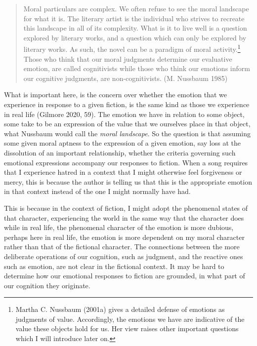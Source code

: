 \documentclass[12pt]{book}
\theoremstyle{definition}
\theoremstyle{remark}
\begin{document}
\begin{quote}
Moral particulars are complex. We often refuse to see the moral landscape for what it is. The literary artist is the individual who strives to recreate this landscape in all of its complexity. What is it to live well is a question explored by literary works, and a question which can only be explored by literary works. As such, the novel can be a paradigm of moral activity.\footnote{Martha C. Nussbaum (2001a) gives a detailed defense of emotions as judgments of value. Accordingly, the emotions we have are indicative of the value these objects hold for us. Her view raises other important questions which I will introduce later on.} Those who think that our moral judgments determine our evaluative emotion, are called cognitivists while those who think our emotions inform our cognitive judgments, are non-cognitivists. (M. Nussbaum 1985)
\end{quote}

What is important here, is the concern over whether the emotion that we experience in response to a given fiction, is the same kind as those we experience in real life (Gilmore 2020, 59). The emotion we have in relation to some object, some take to be an expression of the value that we ourselves place in that object, what Nussbaum would call the \emph{moral landscape}. So the question is that assuming some given moral aptness to the expression of a given emotion, say loss at the dissolution of an important relationship, whether the criteria governing such emotional expressions accompany our responses to fiction. When a song requires that I experience hatred in a context that I might otherwise feel forgiveness or mercy, this is because the author is telling us that this is the appropriate emotion in that context instead of the one I might normally have had.

This is because in the context of fiction, I might adopt the phenomenal states of that character, experiencing the world in the same way that the character does while in real life, the phenomenal character of the emotion is more dubious, perhaps here in real life, the emotion is more dependent on my moral character rather than that of the fictional character. The connections between the more deliberate operations of our cognition, such as judgment, and the reactive ones such as emotion, are not clear in the fictional context. It may be hard to determine how our emotional responses to fiction are grounded, in what part of our cognition they originate.
\end{document}
